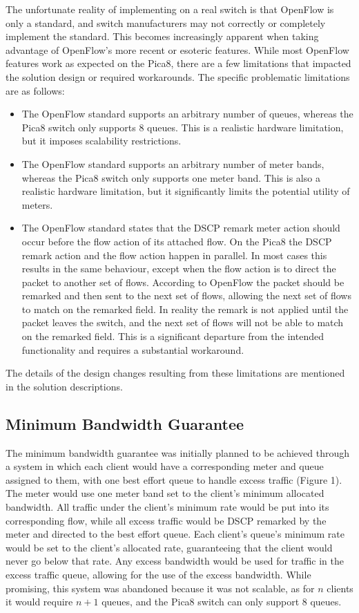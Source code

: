 \documentclass[accepted,single]{gipaper}
\begin{document}
The unfortunate reality of implementing on a real switch is that OpenFlow is only a standard, and switch manufacturers may not correctly or completely implement the standard. This becomes increasingly apparent when taking advantage of OpenFlow's more recent or esoteric features. While most OpenFlow features work as expected on the Pica8, there are a few limitations that impacted the solution design or required workarounds. The specific problematic limitations are as follows: 

\begin{itemize}
\item The OpenFlow standard supports an arbitrary number of queues, whereas the Pica8 switch only supports 8 queues. This is a realistic hardware limitation, but it imposes scalability restrictions.
\item The OpenFlow standard supports an arbitrary number of meter bands, whereas the Pica8 switch only supports one meter band. This is also a realistic hardware limitation, but it significantly limits the potential utility of meters.
\item The OpenFlow standard states that the DSCP remark meter action should occur before the flow action of its attached flow. On the Pica8 the DSCP remark action and the flow action happen in parallel. In most cases this results in the same behaviour, except when the flow action is to direct the packet to another set of flows. According to OpenFlow the packet should be remarked and then sent to the next set of flows, allowing the next set of flows to match on the remarked field. In reality the remark is not applied until the packet leaves the switch, and the next set of flows will not be able to match on the remarked field. This is a significant departure from the intended functionality and requires a substantial workaround.
\end{itemize}

The details of the design changes resulting from these limitations are mentioned in the solution descriptions. 

\subsection{Minimum Bandwidth Guarantee}
\label{min_bandwidth}


The minimum bandwidth guarantee was initially planned to be achieved through a system in which each client would have a corresponding meter and queue assigned to them, with one best effort queue to handle excess traffic (Figure 1). The meter would use one meter band set to the client's minimum allocated bandwidth. All traffic under the client's minimum rate would be put into its corresponding flow, while all excess traffic would be DSCP remarked by the meter and directed to the best effort queue. Each client's queue's minimum rate would be set to the client's allocated rate, guaranteeing that the client would never go below that rate. Any excess bandwidth would be used for traffic in the excess traffic queue, allowing for the use of the excess bandwidth. While promising, this system was abandoned because it was not scalable, as for $n$ clients it would require $n+1$ queues, and the Pica8 switch can only support 8 queues.\\
\end{document}
